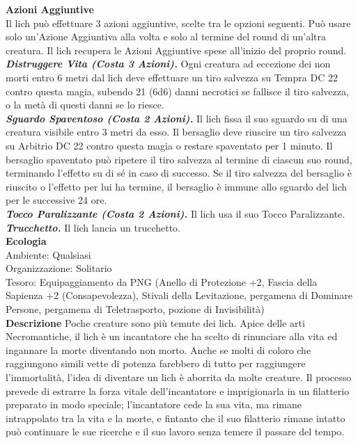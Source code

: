 \begin{multicols}{2}
\textbf{Azioni Aggiuntive}\\

Il lich può effettuare 3 azioni aggiuntive, scelte tra le opzioni seguenti. Può usare solo un'Azione Aggiuntiva alla volta e solo al termine del round di un'altra creatura. Il lich recupera le Azioni Aggiuntive spese all'inizio del proprio round.\\

\emph{\textbf{Distruggere Vita (Costa 3 Azioni).}} Ogni creatura ad eccezione dei non morti entro 6 metri dal lich deve effettuare un tiro salvezza su Tempra DC  22 contro questa magia, subendo 21 (6d6) danni necrotici se fallisce il tiro salvezza, o la metà di questi danni se lo riesce.\\

\emph{\textbf{Sguardo Spaventoso (Costa 2 Azioni).}} Il lich fissa il suo sguardo su di una creatura visibile entro 3 metri da esso. Il bersaglio deve riuscire un tiro salvezza su Arbitrio DC  22 contro questa magia o restare spaventato per 1 minuto. Il bersaglio spaventato può ripetere il tiro salvezza al termine di ciascun suo round, terminando l'effetto su di sé in caso di successo. Se il tiro salvezza del bersaglio è riuscito o l'effetto per lui ha termine, il bersaglio è immune allo sguardo del lich per le successive 24 ore.\\

\emph{\textbf{Tocco Paralizzante (Costa 2 Azioni).}} Il lich usa il suo Tocco Paralizzante.\\

\emph{\textbf{Trucchetto.}} Il lich lancia un trucchetto.\\

\textbf{Ecologia}\\
Ambiente: Qualsiasi\\
Organizzazione: Solitario\\
Tesoro: Equipaggiamento da PNG (Anello di Protezione +2, Fascia della Sapienza +2 (Consapevolezza), Stivali della Levitazione, pergamena di Dominare Persone, pergamena di Teletrasporto, pozione di Invisibilità)\\

\textbf{Descrizione}
Poche creature sono più temute dei lich. Apice delle arti Necromantiche, il lich è un incantatore che ha scelto di rinunciare alla vita ed ingannare la morte diventando non morto. Anche se molti di coloro che raggiungono simili vette di potenza farebbero di tutto per raggiungere l'immortalità, l'idea di diventare un lich è aborrita da molte creature. Il processo prevede di estrarre la forza vitale dell'incantatore e imprigionarla in un filatterio preparato in modo speciale; l'incantatore cede la sua vita, ma rimane intrappolato tra la vita e la morte, e fintanto che il suo filatterio rimane intatto può continuare le sue ricerche e il suo lavoro senza temere il passare del tempo.\\



\end{multicols}
